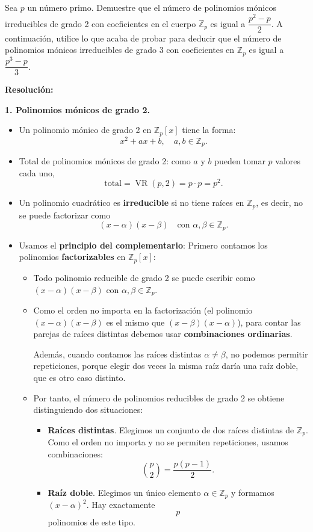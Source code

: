 \documentclass[a4paper,12pt]{article}
\begin{document}
\begin{ejercicio}[title=Ejercicio 28 (⋆)]
Sea $p$ un número primo. Demuestre que el número de polinomios mónicos irreducibles de grado 2 con coeficientes en el cuerpo $\mathbb{Z}_p$ es igual a $\dfrac{p^2 - p}{2}$.  
A continuación, utilice lo que acaba de probar para deducir que el número de polinomios mónicos irreducibles de grado 3 con coeficientes en $\mathbb{Z}_p$ es igual a $\dfrac{p^3 - p}{3}$.

\tcblower
\textbf{Resolución:}

\medskip
\textbf{1. Polinomios mónicos de grado 2.}

\begin{itemize}
\item Un polinomio mónico de grado 2 en $\mathbb{Z}_p[x]$ tiene la forma:
\[
x^2 + ax + b, \quad a,b \in \mathbb{Z}_p.
\]
\item Total de polinomios mónicos de grado 2: como $a$ y $b$ pueden tomar $p$ valores cada uno,
\[
\text{total} = \operatorname{VR}(p,2) = p \cdot p = p^2.
\]
\item Un polinomio cuadrático es \textbf{irreducible} si no tiene raíces en $\mathbb{Z}_p$, es decir, no se puede factorizar como
\[
(x-\alpha)(x-\beta) \quad \text{con } \alpha,\beta \in \mathbb{Z}_p.
\]
\item Usamos el \textbf{principio del complementario}:  
Primero contamos los polinomios \textbf{factorizables} en $\mathbb{Z}_p[x]$:
\begin{itemize}
  \item Todo polinomio reducible de grado 2 se puede escribir como $(x-\alpha)(x-\beta)$ con $\alpha,\beta \in \mathbb{Z}_p$.
  \item Como el orden no importa en la factorización (el polinomio $(x-\alpha)(x-\beta)$ es el mismo que $(x-\beta)(x-\alpha)$), para contar las parejas de raíces distintas debemos usar \textbf{combinaciones ordinarias}.  

Además, cuando contamos las raíces distintas $\alpha \ne \beta$, no podemos permitir repeticiones, porque elegir dos veces la misma raíz daría una raíz doble, que es otro caso distinto.

\item Por tanto, el número de polinomios reducibles de grado 2 se obtiene distinguiendo dos situaciones:

\begin{itemize}
    \item \textbf{Raíces distintas}. Elegimos un conjunto de dos raíces distintas de $\mathbb{Z}_p$. Como el orden no importa y no se permiten repeticiones, usamos combinaciones:
    \[
    \binom{p}{2} = \frac{p(p-1)}{2}.
    \]

    \item \textbf{Raíz doble}. Elegimos un único elemento $\alpha\in\mathbb{Z}_p$ y formamos $(x-\alpha)^2$. Hay exactamente
    \[
    p
    \]
    polinomios de este tipo.
\end{itemize}
\end{itemize}
\end{itemize}
\end{ejercicio}
\end{document}
